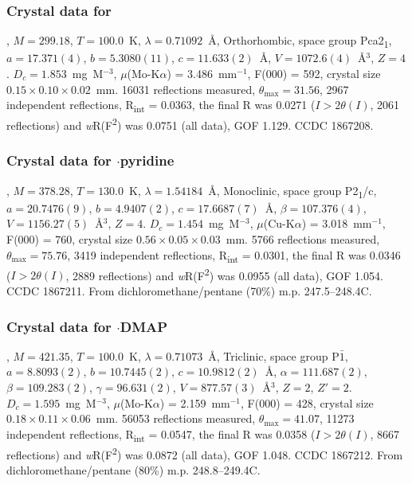\begin{refsection}
\subsubsection{Crystal data for \texorpdfstring{}{C14H8N2OSe}}
, $M=299.18$, $T=100.0$~K, $\lambda=0.71092$~\AA, Orthorhombic, space group Pca2\textsubscript{1}, $a = 17.371(4)$, $b = 5.3080(11)$, $c = 11.633(2)$~\AA, $V = 1072.6(4)$~\AA$^{3}$, $Z = 4$.
$D_{c}= 1.853$~mg~M$^{-3}$, $\mu$(Mo-K$\alpha$) = 3.486~mm$^{-1}$, F(000) = 592, crystal size $0.15 \times 0.10 \times 0.02$~mm.
16031 reflections measured, $\theta_{\mathrm{max}}=31.56$\degree, 2967 independent reflections, R\textsubscript{int} = 0.0363, the final R was 0.0271 ($I > 2\theta(I)$, 2061 reflections) and \emph{w}R(F\textsuperscript{2}) was 0.0751 (all data), GOF 1.129.
CCDC 1867208.

\subsubsection{Crystal data for \texorpdfstring{$\cdot$pyridine}{C19H13N3OSe}}
, $M=378.28$, $T=130.0$~K, $\lambda=1.54184$~\AA, Monoclinic, space group P2\textsubscript{1}/c, $a = 20.7476(9)$, $b = 4.9407(2)$, $c = 17.6687(7)$~\AA, $\beta = 107.376(4)$\degree, $V = 1156.27(5)$~\AA$^{3}$, $Z = 4$.
$D_{c} = 1.454$~mg~M$^{-3}$, $\mu$(Cu-K$\alpha$) = 3.018~mm$^{-1}$, F(000) = 760, crystal size $0.56 \times 0.05 \times 0.03$~mm.
5766 reflections measured, $\theta_{\mathrm{max}} = 75.76$\degree, 3419 independent reflections, R\textsubscript{int} = 0.0301, the final R was 0.0346 ($I > 2\theta(I)$, 2889 reflections) and \emph{w}R(F\textsuperscript{2}) was 0.0955 (all data), GOF 1.054.
CCDC 1867211.
From dichloromethane/pentane (70\%) m.p. 247.5--248.4\degree C.

\subsubsection{Crystal data for \texorpdfstring{$\cdot$DMAP}{C21H18N4OSe}}
, $M = 421.35$, $T=100.0$~K, $\lambda=0.71073$~\AA, Triclinic, space group P$\bar{1}$, $a = 8.8093(2)$, $b = 10.7445(2)$, $c = 10.9812(2)$~\AA, $\alpha = 111.687(2)$\degree, $\beta = 109.283(2)$\degree, $\gamma = 96.631(2)$\degree, $V = 877.57(3)$~\AA$^{3}$, $Z = 2$, $Z\prime = 2$.
$D_{c}= 1.595$~mg~M$^{-3}$, $\mu$(Mo-K$\alpha$) = 2.159~mm$^{-1}$, F(000) = 428, crystal size $0.18 \times 0.11 \times 0.06$~mm.
56053 reflections measured, $\theta_{\mathrm{max}} = 41.07$\degree, 11273 independent reflections, R\textsubscript{int} = 0.0547, the final R was 0.0358 ($I > 2\theta(I)$, 8667 reflections) and \emph{w}R(F\textsuperscript{2}) was 0.0872 (all data), GOF 1.048.
CCDC 1867212.
From dichloromethane/pentane (80\%) m.p. 248.8--249.4\degree C.

\printbibliography[heading=subbibliography]
\end{refsection}


